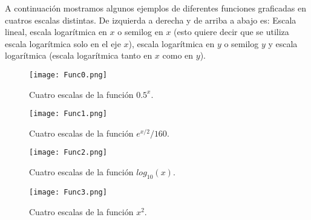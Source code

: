 A continuación mostramos algunos ejemplos de diferentes funciones graficadas en cuatros escalas distintas. De izquierda a derecha y de arriba a abajo es: Escala lineal, escala logarítmica en $x$ o semilog en $x$ (esto quiere decir que se utiliza escala logarítmica solo en el eje $x$), escala logarítmica en $y$ o semilog $y$ y escala logarítmica (escala logarítmica tanto en $x$ como en $y$).\\



 \begin{center}
\begin{figure}[h!]
\centering
\texttt{[image: Func0.png]}
\caption[Cuatro escalas de la función $0.5^{x}$]{Cuatro escalas de la función $0.5^{x}$.} \label{func00}
\end{figure}
\end{center}

 \begin{center}
\begin{figure}[h!]
\centering
\texttt{[image: Func1.png]}
\caption[Cuatro escalas de la función $e^{x/2}/160$]{Cuatro escalas de la función $e^{x/2}/160$.} \label{func01}
\end{figure}
\end{center}

 \begin{center}
\begin{figure}[h!]
\centering
\texttt{[image: Func2.png]}
\caption[Cuatro escalas de la función $log_{10}(x)$]{Cuatro escalas de la función $log_{10}(x)$.} \label{func02}
\end{figure}
\end{center}

 \begin{center}
\begin{figure}[h!]
\centering
\texttt{[image: Func3.png]}
\caption[Cuatro escalas de la función $x^{2}$]{Cuatro escalas de la función $x^{2}$.} \label{func03}
\end{figure}
\end{center}